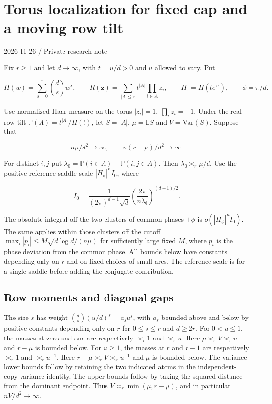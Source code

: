 \section{Torus localization for fixed cap and a moving row tilt}\label{sec:localization}

2026-11-26 / Private research note

Fix $r\ge1$ and let $d\to\infty$, with $t=u/d>0$ and $u$ allowed to vary. Put

\begin{equation*}
H(w)=\sum_{s=0}^r\binom ds w^s,\qquad
R(\mathbf z)=\sum_{|A|\le r}t^{|A|}\prod_{i\in A}z_i,\qquad
H_\tau=H(te^{i\tau}),\qquad \phi=\pi/d .
\end{equation*}

Use normalized Haar measure on the torus $|z_i|=1$, $\prod_i z_i=-1$. Under the real row tilt $\mathbb P(A)=t^{|A|}/H(t)$, let $S=|A|$, $\mu=\mathbb E S$ and $V=\mathrm{Var}(S)$. Suppose that

\begin{equation*}
n\mu/d^2\longrightarrow\infty,\qquad
n(r-\mu)/d^2\longrightarrow\infty.
\end{equation*}

For distinct $i,j$ put $\lambda_0=\mathbb P(i\in A)-\mathbb P(i,j\in A)$. Then $\lambda_0\asymp_r\mu/d$. Use the positive reference saddle scale $|H_\phi|^n I_0$, where

\begin{equation*}
I_0=\frac{1}{(2\pi)^{d-1}\sqrt d}
\left(\frac{2\pi}{n\lambda_0}\right)^{(d-1)/2}.
\end{equation*}

The absolute integral off the two clusters of common phases $\pm\phi$ is $o(|H_\phi|^n I_0)$. The same applies within those clusters off the cutoff $\max_i|p_i|\le M\sqrt{d\log d/(n\mu)}$ for sufficiently large fixed $M$, where $p_i$ is the phase deviation from the common phase. All bounds below have constants depending only on $r$ and on fixed choices of small arcs. The reference scale is for a single saddle before adding the conjugate contribution.

\subsection{Row moments and diagonal gaps}

The size $s$ has weight $\binom ds (u/d)^s=a_su^s$, with $a_s$ bounded above and below by positive constants depending only on $r$ for $0\le s\le r$ and $d\ge2r$. For $0<u\le1$, the masses at zero and one are respectively $\asymp_r1$ and $\asymp_r u$. Here $\mu\asymp_r V\asymp_r u$ and $r-\mu$ is bounded below. For $u\ge1$, the masses at $r$ and $r-1$ are respectively $\asymp_r1$ and $\asymp_r u^{-1}$. Here $r-\mu\asymp_r V\asymp_r u^{-1}$ and $\mu$ is bounded below. The variance lower bounds follow by retaining the two indicated atoms in the independent-copy variance identity. The upper bounds follow by taking the squared distance from the dominant endpoint. Thus $V\asymp_r\min(\mu,r-\mu)$, and in particular $nV/d^2\to\infty$.

